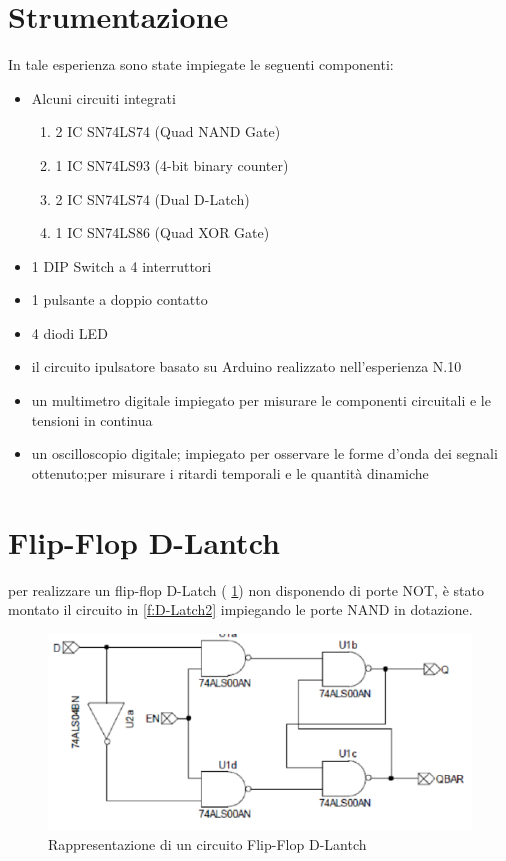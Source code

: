 \section{Strumentazione}
	In tale esperienza sono state impiegate le seguenti componenti:\begin{itemize}
		\item Alcuni circuiti integrati \begin{enumerate}
			\item 2 IC SN74LS74 (Quad NAND Gate)
			\item 1 IC SN74LS93 (4-bit binary counter)
			\item 2 IC SN74LS74 (Dual D-Latch)
			\item 1 IC SN74LS86 (Quad XOR Gate)
		\end{enumerate}
		\item 1 DIP Switch a 4 interruttori
		\item 1 pulsante a doppio contatto
		\item 4 diodi LED
		\item il circuito ipulsatore basato su Arduino realizzato nell'esperienza N.10
		\item un multimetro digitale impiegato per misurare le componenti circuitali e le tensioni in continua
		\item un oscilloscopio digitale; impiegato per osservare le forme d'onda dei segnali ottenuto;per misurare i ritardi temporali e le quantità dinamiche
	\end{itemize}
\section{Flip-Flop D-Lantch}
	per realizzare un flip-flop D-Latch (\figurename{ \ref{f:D-Latch1}}) non disponendo di porte NOT, è stato montato il circuito in \figurename{ \ref{f:D-Latch2}} impiegando le 
	porte NAND in dotazione.
	\begin{figure}[hb]
		\centering
		\includegraphics[scale=0.75]{../Figs-Tabs/D-Latch1.png}
		\caption{Rappresentazione di un circuito Flip-Flop D-Lantch}
			\label{f:D-Latch1}
	\end{figure}
	
